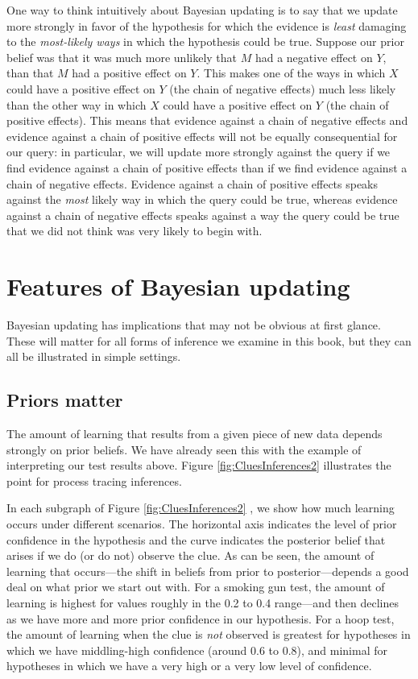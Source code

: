 \documentclass[
  12pt,
]{book}
\begin{document}
One way to think intuitively about Bayesian updating is to say that we update more strongly in favor of the hypothesis for which the evidence is \emph{least} damaging to the \emph{most-likely ways} in which the hypothesis could be true. Suppose our prior belief was that it was much more unlikely that \(M\) had a negative effect on \(Y\), than that \(M\) had a positive effect on \(Y\). This makes one of the ways in which \(X\) could have a positive effect on \(Y\) (the chain of negative effects) much less likely than the other way in which \(X\) could have a positive effect on \(Y\) (the chain of positive effects). This means that evidence against a chain of negative effects and evidence against a chain of positive effects will not be equally consequential for our query: in particular, we will update more strongly against the query if we find evidence against a chain of positive effects than if we find evidence against a chain of negative effects. Evidence against a chain of positive effects speaks against the \emph{most} likely way in which the query could be true, whereas evidence against a chain of negative effects speaks against a way the query could be true that we did not think was very likely to begin with.

\hypertarget{features-of-bayesian-updating}{%
\section{Features of Bayesian updating}\label{features-of-bayesian-updating}}

Bayesian updating has implications that may not be obvious at first glance. These will matter for all forms of inference we examine in this book, but they can all be illustrated in simple settings.

\hypertarget{AppPriors}{%
\subsection{Priors matter}\label{AppPriors}}

The amount of learning that results from a given piece of new data depends strongly on prior beliefs. We have already seen this with the example of interpreting our test results above. Figure \ref{fig:CluesInferences2} illustrates the point for process tracing inferences.

In each subgraph of Figure \ref{fig:CluesInferences2} , we show how much learning occurs under different scenarios. The horizontal axis indicates the level of prior confidence in the hypothesis and the curve indicates the posterior belief that arises if we do (or do not) observe the clue. As can be seen, the amount of learning that occurs---the shift in beliefs from prior to posterior---depends a good deal on what prior we start out with. For a smoking gun test, the amount of learning is highest for values roughly in the 0.2 to 0.4 range---and then declines as we have more and more prior confidence in our hypothesis. For a hoop test, the amount of learning when the clue is \emph{not} observed is greatest for hypotheses in which we have middling-high confidence (around 0.6 to 0.8), and minimal for hypotheses in which we have a very high or a very low level of confidence.
\end{document}
